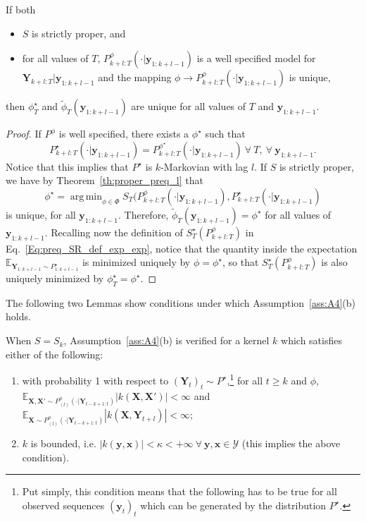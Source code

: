 \documentclass[twoside,11pt]{article}
\newcommand{\E}{\mathbb{E}}
\newcommand{\ddsim}{\mathbf{x}}
\newcommand{\ddobs}{\mathbf{y}}
\newcommand{\Ddsim}{\mathbf{X}}
\newcommand{\Ddobs}{\mathbf{Y}}
\newcommand{\ddobsupkplusl}{\mathbf{y}_{1:k+l-1}}
\newcommand{\Ddobsupkplusl}{\mathbf{Y}_{1:k+l-1}}
\newcommand{\DdobsupTfromk}{\mathbf{Y}_{k+l:T}}
\DeclareMathOperator*{\argmin}{arg\,min}
\begin{document}
	\begin{lemma}\label{lemma:unique}
		If both
		\begin{itemize}
			\item $ S $ is strictly proper, and 
			\item for all values of $ T $, $ P^\phi_{k+l:T}(\cdot|\ddobsupkplusl) $ is a well specified model for $ \DdobsupTfromk|\ddobsupkplusl $ and the mapping $ \phi  \to P^\phi_{k+l:T}(\cdot|\ddobsupkplusl) $ is unique,
		\end{itemize} then $ \phi^\star_T $ and $ \tilde \phi_T(\ddobsupkplusl) $ are unique for all values of $ T $ and $ \ddobsupkplusl $.
	\end{lemma}
	\begin{proof}
		If $ P^\phi $ is well specified, there exists a $ \phi^\star $ such that $$ P^\star_{k+l:T}(\cdot|\ddobsupkplusl) = P^{\phi^\star}_{k+l:T}(\cdot|\ddobsupkplusl)\ \forall \ T, \ \forall \ \ddobsupkplusl. $$ Notice that this implies that $ P^\star $ is $ k $-Markovian with lag $ l $. If $ S $ is strictly proper, we have by Theorem~\ref{th:proper_preq_l} that
		\begin{equation}\label{}
		\phi^\star =\argmin_{\phi\in\Phi} S_T(P_{k+l:T}^\phi(\cdot|\ddobsupkplusl), P_{k+l:T}^\star(\cdot|\ddobsupkplusl)
		\end{equation}
		is unique, for all $ \ddobsupkplusl $. Therefore, $ \tilde \phi_T(\ddobsupkplusl) = \phi^\star $ for all values of $ \ddobsupkplusl $. Recalling now the definition of $ S_T^\star(P^\phi_{k+l:T}) $ in Eq.~\eqref{Eq:preq_SR_def_exp_exp}, notice that the quantity inside the expectation $ \E_{\Ddobsupkplusl\sim P^\star_{1:k+l-1}} $ is minimized uniquely by $ \phi= \phi^\star $, so that 
		$ S_T^\star(P^\phi_{k+l:T}) $ is also uniquely minimized by $ \phi_T^\star= \phi^\star $.
	\end{proof}
	
	The following two Lemmas show conditions under which Assumption~\ref{ass:A4}(b) holds.
	
	\begin{lemma}\label{lemma:bounded_kernel}
		When $ S = S_k $, Assumption~\ref{ass:A4}(b) is verified for a kernel $ k $ which satisfies either of the following:
		\begin{enumerate}
			\item with probability 1 with respect to $ (\Ddobs_t)_t\sim P^\star $,\footnote{Put simply, this condition means that the following has to be true for all observed sequences $ (\ddobs_t)_t $ which can be generated by the distribution $ P^\star $.} for all $ t\ge k $ and $ \phi $, \\ $ \E_{\Ddsim,\Ddsim'\sim P^\phi_{(l)}(\cdot|\Ddobs_{t-k+1:t})}|k(\Ddsim,\Ddsim')|<\infty  $ and $ \E_{\Ddsim\sim P^\phi_{(l)}(\cdot|\Ddobs_{t-k+1:t})}|k(\Ddsim,\Ddobs_{t+l})|<\infty $;
			\item $ k $ is bounded, i.e. $ |k(\ddobs,\ddsim)| <\kappa<+\infty \ \forall \ \ddobs,\ddsim \in \mathcal Y$ (this implies the above condition).
		\end{enumerate} 
	\end{lemma}
	
\end{document}
